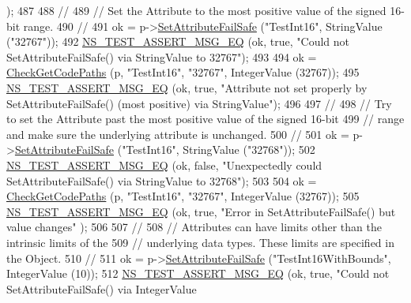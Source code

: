\begin{DoxyCode}
      );
487 
488   \textcolor{comment}{//}
489   \textcolor{comment}{// Set the Attribute to the most positive value of the signed 16-bit range.}
490   \textcolor{comment}{//}
491   ok = p->\hyperlink{classns3_1_1ObjectBase_aa7d333004e970f925a4ed5df275541b5}{SetAttributeFailSafe} (\textcolor{stringliteral}{"TestInt16"}, StringValue (\textcolor{stringliteral}{"32767"}));
492   \hyperlink{group__testing_ga2a9d78cffb3db8e867c35fff0b698cf5}{NS\_TEST\_ASSERT\_MSG\_EQ} (ok, \textcolor{keyword}{true}, \textcolor{stringliteral}{"Could not SetAttributeFailSafe() via StringValue
       to 32767"});
493 
494   ok = \hyperlink{classAttributeTestCase_a902fb84c803f1c898329f9263575331e}{CheckGetCodePaths} (p, \textcolor{stringliteral}{"TestInt16"}, \textcolor{stringliteral}{"32767"}, IntegerValue (32767));
495   \hyperlink{group__testing_ga2a9d78cffb3db8e867c35fff0b698cf5}{NS\_TEST\_ASSERT\_MSG\_EQ} (ok, \textcolor{keyword}{true}, \textcolor{stringliteral}{"Attribute not set properly by
       SetAttributeFailSafe() (most positive) via StringValue"});
496 
497   \textcolor{comment}{//}
498   \textcolor{comment}{// Try to set the Attribute past the most positive value of the signed 16-bit}
499   \textcolor{comment}{// range and make sure the underlying attribute is unchanged.}
500   \textcolor{comment}{//}
501   ok = p->\hyperlink{classns3_1_1ObjectBase_aa7d333004e970f925a4ed5df275541b5}{SetAttributeFailSafe} (\textcolor{stringliteral}{"TestInt16"}, StringValue (\textcolor{stringliteral}{"32768"}));
502   \hyperlink{group__testing_ga2a9d78cffb3db8e867c35fff0b698cf5}{NS\_TEST\_ASSERT\_MSG\_EQ} (ok, \textcolor{keyword}{false}, \textcolor{stringliteral}{"Unexpectedly could SetAttributeFailSafe() via
       StringValue to 32768"});
503 
504   ok = \hyperlink{classAttributeTestCase_a902fb84c803f1c898329f9263575331e}{CheckGetCodePaths} (p, \textcolor{stringliteral}{"TestInt16"}, \textcolor{stringliteral}{"32767"}, IntegerValue (32767));
505   \hyperlink{group__testing_ga2a9d78cffb3db8e867c35fff0b698cf5}{NS\_TEST\_ASSERT\_MSG\_EQ} (ok, \textcolor{keyword}{true}, \textcolor{stringliteral}{"Error in SetAttributeFailSafe() but value changes"}
      );
506 
507   \textcolor{comment}{//}
508   \textcolor{comment}{// Attributes can have limits other than the intrinsic limits of the}
509   \textcolor{comment}{// underlying data types.  These limits are specified in the Object.}
510   \textcolor{comment}{//}
511   ok = p->\hyperlink{classns3_1_1ObjectBase_aa7d333004e970f925a4ed5df275541b5}{SetAttributeFailSafe} (\textcolor{stringliteral}{"TestInt16WithBounds"}, IntegerValue (10));
512   \hyperlink{group__testing_ga2a9d78cffb3db8e867c35fff0b698cf5}{NS\_TEST\_ASSERT\_MSG\_EQ} (ok, \textcolor{keyword}{true}, \textcolor{stringliteral}{"Could not SetAttributeFailSafe() via IntegerValue
}
\end{DoxyCode}
